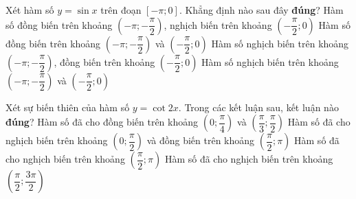 \begin{ex}%
	Xét hàm số $  y=\sin x $ trên đoạn $ [-\pi;0] $. Khẳng định nào sau đây \textbf{đúng}?
	 \choice
		{Hàm số đồng biến trên khoảng $ \left(-\pi;-\dfrac{\pi}{2}\right) $, nghịch biến trên khoảng $ \left(-\dfrac{\pi}{2};0\right)$} 
		{Hàm số đồng biến trên khoảng $  \left(-\pi;-\dfrac{\pi}{2}\right) $ và $ \left(-\dfrac{\pi}{2};0\right)$}
		{\True Hàm số nghịch biến trên khoảng $ \left(-\pi;-\dfrac{\pi}{2}\right) $, đồng  biến trên khoảng $ \left(-\dfrac{\pi}{2};0\right)$}
		{Hàm số nghịch biến trên khoảng $ \left(-\pi;-\dfrac{\pi}{2}\right) $  và $ \left(-\dfrac{\pi}{2};0\right)$}
\end{ex}

\begin{ex}[c]%
	Xét sự biến thiên của hàm số $ y=\cot  2x $. Trong các kết luận sau, kết luận nào \textbf{đúng}?
	\choice 
		{Hàm số đã cho đồng biến trên  khoảng $ \left(0;\dfrac{\pi}{4}\right) $ và $ \left(\dfrac{\pi}{3};\dfrac{\pi}{2}\right) $}
		 {Hàm số đã cho nghịch biến trên khoảng $ \left(0;\dfrac{\pi}{2}\right) $ và đồng biến trên khoảng $ \left(\dfrac{\pi}{2};\pi \right) $}
		{\True Hàm số đã cho nghịch biến trên  khoảng $ \left(\dfrac{\pi}{2};\pi\right) $}
		{Hàm  số đã cho nghịch biến trên khoảng $ \left(\dfrac{\pi}{2};\dfrac{3\pi}{2}\right) $}
\end{ex}

